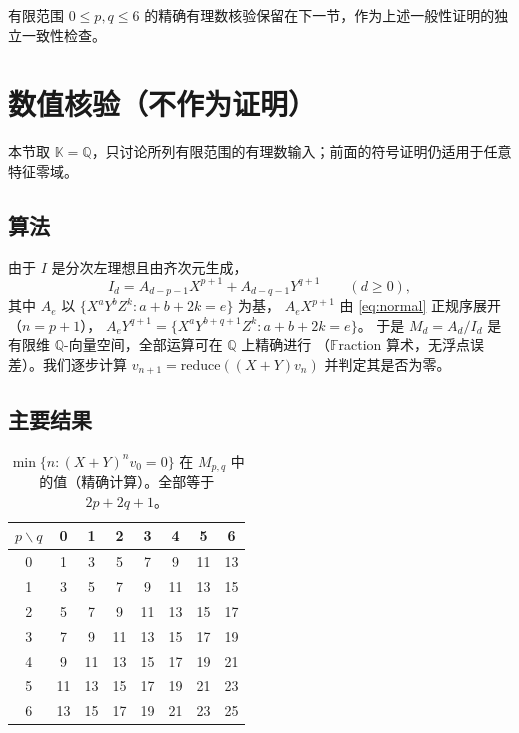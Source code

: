\documentclass[11pt,UTF8]{ctexart}
\theoremstyle{definition}
\newcommand{\Q}{\mathbb{Q}}
\newcommand{\K}{\mathbb{K}}
\begin{document}
有限范围 $0\le p,q\le6$ 的精确有理数核验保留在下一节，作为上述一般性证明的独立一致性检查。

\section{数值核验（不作为证明）}\label{sec:numerics}

本节取 $\K=\Q$，只讨论所列有限范围的有理数输入；前面的符号证明仍适用于任意特征零域。

\subsection{算法}

由于 $I$ 是分次左理想且由齐次元生成，
\[
I_d=A_{d-p-1}X^{p+1}+A_{d-q-1}Y^{q+1}\qquad(d\ge0),
\]
其中 $A_{e}$ 以 $\{X^aY^bZ^k: a+b+2k=e\}$ 为基，
$A_{e}X^{p+1}$ 由 \eqref{eq:normal} 正规序展开（$n=p+1$），
$A_{e}Y^{q+1}=\{X^aY^{b+q+1}Z^k: a+b+2k=e\}$。
于是 $M_d=A_d/I_d$ 是有限维 $\Q$-向量空间，全部运算可在 $\Q$ 上精确进行
（$\mathbb{F}$raction 算术，无浮点误差）。我们逐步计算
$v_{n+1}=\text{reduce}((X+Y)v_n)$ 并判定其是否为零。

\subsection{主要结果}

\begin{table}[htbp]
\centering
\caption{$\min\{n:(X+Y)^nv_0=0\}$ 在 $M_{p,q}$ 中的值（精确计算）。全部等于 $2p+2q+1$。}
\label{tab:N}
\begin{tabular}{c|ccccccc}
\toprule
$p\backslash q$ & 0 & 1 & 2 & 3 & 4 & 5 & 6\\
\midrule
0 & 1 & 3 & 5 & 7 & 9 & 11 & 13\\
1 & 3 & 5 & 7 & 9 & 11 & 13 & 15\\
2 & 5 & 7 & 9 & 11 & 13 & 15 & 17\\
3 & 7 & 9 & 11 & 13 & 15 & 17 & 19\\
4 & 9 & 11 & 13 & 15 & 17 & 19 & 21\\
5 & 11 & 13 & 15 & 17 & 19 & 21 & 23\\
6 & 13 & 15 & 17 & 19 & 21 & 23 & 25\\
\bottomrule
\end{tabular}
\end{table}
\end{document}
